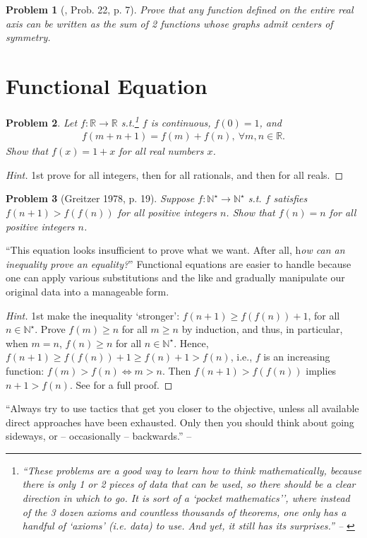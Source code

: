 \documentclass[oneside]{book}
\numberwithin{equation}{section}
\newtheorem{problem}{Problem}[section]
\begin{document}
\begin{problem}[\cite{Gelca_Andreescu2017}, Prob. 22, p. 7]
	Prove that any function defined on the entire real axis can be written as the sum of 2 functions whose graphs admit centers of symmetry.
\end{problem}

\section{Functional Equation}
\begin{problem}
	Let $f:\mathbb{R}\to\mathbb{R}$ s.t.\footnote{``These problems are a good way to learn how to think mathematically, because there is only 1 or 2 pieces of data that can be used, so there should be a clear direction in which to go. It is sort of a `pocket mathematics'’, where instead of the 3 dozen axioms and countless thousands of theorems, one only has a handful of `axioms' (i.e. data) to use. And yet, it still has its surprises.'' -- \cite[Chap. 3, p. 36]{Tao2006}} $f$ is continuous, $f(0) = 1$, and
	\begin{align*}
		f(m + n + 1) = f(m) + f(n),\ \forall m,n\in\mathbb{R}.
	\end{align*}
	Show that $f(x) = 1 + x$ for all real numbers $x$.
\end{problem}

\begin{proof}[Hint]
	1st prove for all integers, then for all rationals, and then for all reals.
\end{proof}

\begin{problem}[Greitzer 1978, p. 19]
	Suppose $f:\mathbb{N}^\star\to\mathbb{N}^\star$ s.t. $f$ satisfies $f(n + 1) > f(f(n))$ for all positive integers $n$. Show that $f(n) = n$ for all positive integers $n$.
\end{problem}
``This equation looks insufficient to prove what we want. After all, h\textit{ow can an inequality prove an equality?}'' Functional equations are easier to handle because one can apply various substitutions and the like and gradually manipulate our original data into a manageable form.

\begin{proof}[Hint]
	1st make the inequality `stronger': $f(n + 1)\ge f(f(n)) + 1$, for all $n\in\mathbb{N}^\star$. Prove $f(m)\ge n$ for all $m\ge n$ by induction, and thus, in particular, when $m = n$, $f(n)\ge n$ for all $n\in\mathbb{N}^\star$. Hence, $f(n + 1)\ge f(f(n)) + 1\ge f(n) + 1 > f(n)$, i.e., $f$ is an increasing function: $f(m) > f(n)\Leftrightarrow m > n$. Then $f(n + 1) > f(f(n))$ implies $n + 1 > f(n)$. See \cite[pp. 36--38]{Tao2006} for a full proof.
\end{proof}
``Always try to use tactics that get you closer to the objective, unless all available direct approaches have been exhausted. Only then you should think about going sideways, or -- occasionally -- backwards.'' -- \cite[p. 37]{Tao2006}
\end{document}
